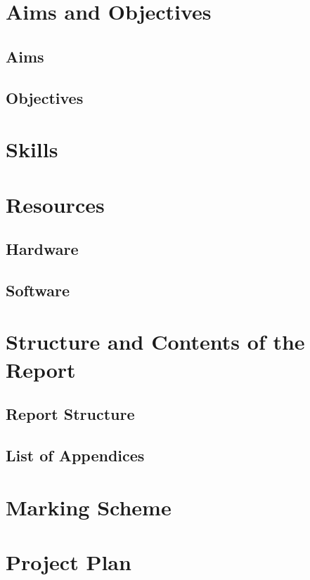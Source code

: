 \section{Aims and Objectives}
\subsection{Aims}
\subsection{Objectives}
\section{Skills}
\section{Resources}
\subsection{Hardware}
\subsection{Software}

\section{Structure and Contents of the Report}
\subsection{Report Structure}
\subsection{List of Appendices}

\section{Marking Scheme}


\clearpage
\section{Project Plan}~
\noindent
{}
